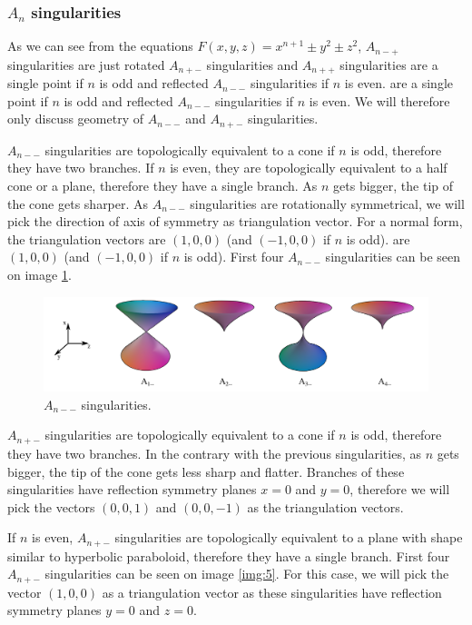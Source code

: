 \begin{definition}
\subsubsection*{$A_n$ singularities}

As we can see from the equations 
$F(x,y,z)=x^{n+1}\pm y^2\pm z^2$, $A_{n-+}$
singularities are just rotated $A_{n+-}$ singularities and $A_{n++}$ singularities
are a single point if $n$ is odd and reflected $A_{n--}$ singularities if $n$ is even. 
are a single point if $n$ is odd and reflected $A_{n--}$ singularities if $n$ is even. 
We will therefore only discuss geometry of $A_{n--}$ and $A_{n+-}$ singularities.

$A_{n--}$ singularities are topologically equivalent to a cone if $n$ is odd, therefore
they have two branches.
If $n$ is even, they are topologically equivalent to a half cone or a plane, therefore
they have a single branch.
As $n$ gets bigger, the tip of the cone gets sharper. As $A_{n--}$ singularities
are rotationally symmetrical, we will pick the direction of
axis of symmetry as triangulation vector. For a normal form, the triangulation vectors
are $(1, 0, 0)$ (and $(-1, 0, 0)$ if $n$ is odd).
are $(1, 0, 0)$ (and $(-1, 0, 0)$ if $n$ is odd).
First four $A_{n--}$ singularities can be seen on image \ref{img:4}.

\begin{figure}
    \centerline{\includegraphics[width=1\textwidth]{images/img4}}
    \caption[$A_{n--}$ singularities]
    {$A_{n--}$ singularities. \cite{singsurf}}
    \label{img:4}
\end{figure}


$A_{n+-}$ singularities are topologically equivalent to a cone if $n$ is odd, therefore
they have two branches.
In the contrary with the previous singularities, as $n$ gets bigger, the tip
of the cone gets less sharp and flatter. Branches of these singularities have 
reflection symmetry planes $x=0$ and $y=0$, therefore we will pick the vectors
$(0, 0, 1)$ and $(0, 0, -1)$ as the triangulation vectors.

If $n$ is even, $A_{n+-}$ singularities are topologically equivalent to a plane
with shape similar to hyperbolic paraboloid, therefore they have a single branch.
First four $A_{n+-}$ singularities can be seen on image \ref{img:5}.
For this case, we will pick the vector $(1, 0, 0)$ as a triangulation vector as
these singularities have reflection symmetry planes $y=0$ and $z=0$.


\end{definition}
